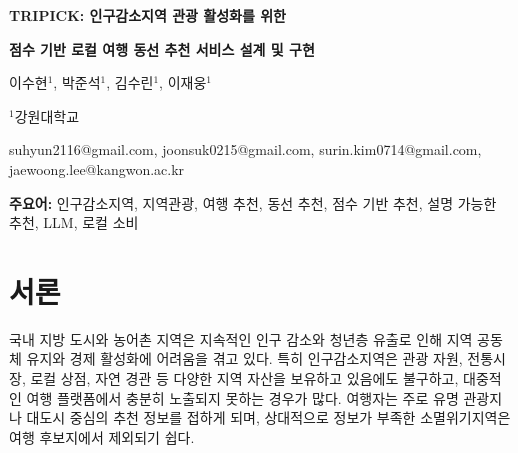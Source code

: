 \documentclass[10pt,a4paper]{article}
\begin{document}
\begin{center}
{\LARGE\bfseries TRIPICK: 인구감소지역 관광 활성화를 위한\par}
{\LARGE\bfseries 점수 기반 로컬 여행 동선 추천 서비스 설계 및 구현\par}

\vspace{0.45cm}

이수현$^{1}$, 박준석$^{1}$, 김수린$^{1}$, 이재웅$^{1}$

\vspace{0.2cm}

$^{1}$강원대학교

\vspace{0.2cm}

{\small
suhyun2116@gmail.com, joonsuk0215@gmail.com, surin.kim0714@gmail.com, jaewoong.lee@kangwon.ac.kr
}
\end{center}

\vspace{0.8cm}

\begin{abstract}
최근 국내 인구감소지역은 관광 자원과 로컬 상권을 보유하고 있음에도 불구하고, 낮은 정보 접근성과 부족한 홍보로 인해 여행지로 선택되는 빈도가 낮다. 본 논문에서는 인구감소지역의 숨은 관광지와 로컬 소비 장소를 사용자 조건에 맞게 추천하는 여행 서비스 TRIPICK을 제안한다. TRIPICK은 사용자의 여행 테마, 이동수단, 여행 시간, 동행 유형을 기반으로 장소 후보를 점수화하고, 내부 지역 기여도와 로컬 소비 가능성을 반영하여 동선형 여행 코스를 추천한다. 또한 OpenAI 기반 LLM을 활용하여 추천 이유를 생성하며, LLM 호출 실패 시 룰 기반 추천 이유 생성 방식으로 대체되는 fallback 구조를 적용하였다. 본 시스템은 5개 권역, 89개 지역, 총 4,578개 장소 데이터를 기반으로 구현되었다. 20개 내부 추천 시나리오 기반 검증에서 모든 케이스가 사전에 정의한 적합 기준을 충족하였으며, 실제 추천 응답에 포함된 장소 기준 로컬 소비 장소 포함률은 85.0\%로 나타났다. 본 연구는 단순 관광지 추천을 넘어, 지역 방문 유도와 로컬 소비 촉진을 결합한 지역 활성화형 여행 추천 서비스의 가능성을 제시한다.
\end{abstract}

\noindent
\textbf{주요어:} 인구감소지역, 지역관광, 여행 추천, 동선 추천, 점수 기반 추천, 설명 가능한 추천, LLM, 로컬 소비

\section{서론}

국내 지방 도시와 농어촌 지역은 지속적인 인구 감소와 청년층 유출로 인해 지역 공동체 유지와 경제 활성화에 어려움을 겪고 있다. 특히 인구감소지역은 관광 자원, 전통시장, 로컬 상점, 자연 경관 등 다양한 지역 자산을 보유하고 있음에도 불구하고, 대중적인 여행 플랫폼에서 충분히 노출되지 못하는 경우가 많다. 여행자는 주로 유명 관광지나 대도시 중심의 추천 정보를 접하게 되며, 상대적으로 정보가 부족한 소멸위기지역은 여행 후보지에서 제외되기 쉽다.
\end{document}
